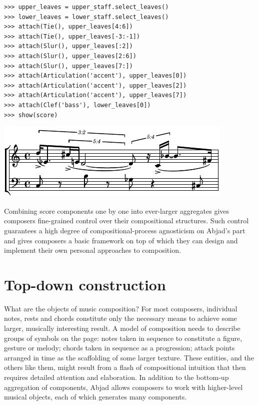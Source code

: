 \documentclass{article}
\begin{document}
\begin{lstlisting}
>>> upper_leaves = upper_staff.select_leaves()
>>> lower_leaves = lower_staff.select_leaves()
>>> attach(Tie(), upper_leaves[4:6])
>>> attach(Tie(), upper_leaves[-3:-1])
>>> attach(Slur(), upper_leaves[:2])
>>> attach(Slur(), upper_leaves[2:6])
>>> attach(Slur(), upper_leaves[7:])
>>> attach(Articulation('accent'), upper_leaves[0])
>>> attach(Articulation('accent'), upper_leaves[2])
>>> attach(Articulation('accent'), upper_leaves[7])
>>> attach(Clef('bass'), lower_leaves[0])
>>> show(score)
\end{lstlisting}
\includegraphics{assets/lilypond-19c9fd0f2ed858d81b6840584a4e0cc8.pdf}

\noindent Combining score components one by one into ever-larger aggregates
gives composers fine-grained control over their compositional structures. Such
control guarantees a high degree of compositional-process agnosticism on
Abjad's part and gives composers a basic framework on top of which they can
design and implement their own personal approaches to composition.

\section{Top-down construction} \label{sec:top-down}

What are the objects of music composition? For most composers, individual
notes, rests and chords constitute  only the necessary means to achieve some
larger, musically interesting result. A model of composition needs to describe
groups of symbols on the page: notes taken in sequence to constitute a figure,
gesture or melody; chords taken in sequence as a progression; attack points
arranged in time as the scaffolding of some larger texture. These entities, and
the others like them, might result from a flash of compositional intuition that
then requires detailed attention and elaboration. In addition to the bottom-up
aggregation of components, Abjad allows composers to work with higher-level
musical objects, each of which generates many components.
\end{document}
